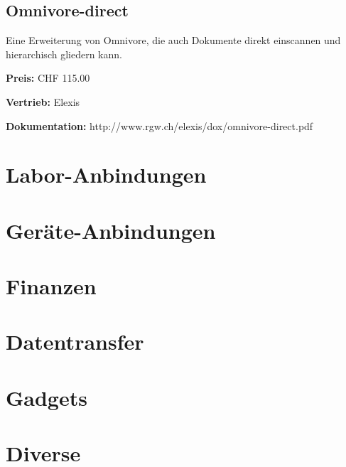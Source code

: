 \documentclass[paper=a4,BCOR8.25mm]{scrartcl}
\begin{document}
\subsection{Omnivore-direct}
Eine Erweiterung von Omnivore, die auch Dokumente direkt einscannen und hierarchisch gliedern kann.

\textbf{Preis:} CHF 115.00

\textbf{Vertrieb:} Elexis

\textbf{Dokumentation:} http://www.rgw.ch/elexis/dox/omnivore-direct.pdf




\section{Labor-Anbindungen}

\section{Geräte-Anbindungen}

\section{Finanzen}

\section{Datentransfer}

\section{Gadgets}

\section{Diverse}
\end{document}

